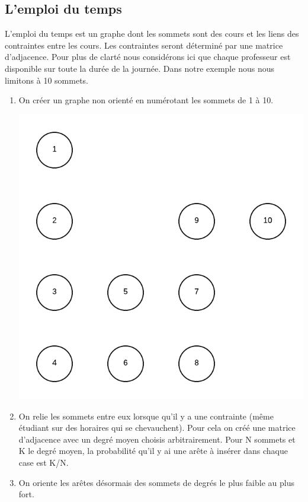 \documentclass[a4paper,11pt]{article}
\begin{document}
	\subsection{L'emploi du temps}
		L'emploi du temps est un graphe dont les sommets sont des cours et les liens des contraintes entre les cours. Les contraintes seront déterminé par une matrice d'adjacence.
		Pour plus de clarté nous considérons ici que chaque professeur est disponible sur toute la durée de la journée.
		Dans notre exemple nous nous limitons à 10 sommets.
		\begin{enumerate}
			\item On créer un graphe non orienté en numérotant les sommets de 1 à 10.
			\centerline{\includegraphics[scale=0.8]{Captures/exemple1.png}}
			\item On relie les sommets entre eux lorsque qu'il y a une contrainte (même étudiant sur des horaires qui se chevauchent). Pour cela on créé une matrice d'adjacence avec un degré moyen choisis arbitrairement. Pour N sommets et K le degré moyen, la probabilité qu'il y ai une arête à insérer dans chaque case est K/N.
			\item On oriente les arêtes désormais des sommets de degrés le plus faible au plus fort.\\

\end{enumerate}
\end{document}
